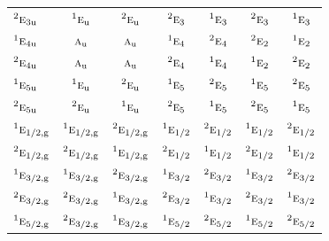 \documentclass[10pt,a4paper]{article}
\numberwithin{equation}{section}
\newcommand{\irr}[1]{\text{\normalfont\scshape #1}}
\newcommand{\conjpair}[1]{{}^{#1}}
\newcommand{\ptag}[1]{\mathrm{#1}}
\begin{document}
{\begin{longtable}{@{}lcccccc@{}}
$\conjpair{2}\irr{e}_{3\ptag{u}}$ & $\conjpair{1}\irr{e}_{\ptag{u}}$ & $\conjpair{2}\irr{e}_{\ptag{u}}$ & $\conjpair{2}\irr{e}_{3}$ & $\conjpair{1}\irr{e}_{3}$ & $\conjpair{2}\irr{e}_{3}$ & $\conjpair{1}\irr{e}_{3}$\\
$\conjpair{1}\irr{e}_{4\ptag{u}}$ & $\irr{a}_{\ptag{u}}$ & $\irr{a}_{\ptag{u}}$ & $\conjpair{1}\irr{e}_{4}$ & $\conjpair{2}\irr{e}_{4}$ & $\conjpair{2}\irr{e}_{2}$ & $\conjpair{1}\irr{e}_{2}$\\
$\conjpair{2}\irr{e}_{4\ptag{u}}$ & $\irr{a}_{\ptag{u}}$ & $\irr{a}_{\ptag{u}}$ & $\conjpair{2}\irr{e}_{4}$ & $\conjpair{1}\irr{e}_{4}$ & $\conjpair{1}\irr{e}_{2}$ & $\conjpair{2}\irr{e}_{2}$\\
$\conjpair{1}\irr{e}_{5\ptag{u}}$ & $\conjpair{1}\irr{e}_{\ptag{u}}$ & $\conjpair{2}\irr{e}_{\ptag{u}}$ & $\conjpair{1}\irr{e}_{5}$ & $\conjpair{2}\irr{e}_{5}$ & $\conjpair{1}\irr{e}_{5}$ & $\conjpair{2}\irr{e}_{5}$\\
$\conjpair{2}\irr{e}_{5\ptag{u}}$ & $\conjpair{2}\irr{e}_{\ptag{u}}$ & $\conjpair{1}\irr{e}_{\ptag{u}}$ & $\conjpair{2}\irr{e}_{5}$ & $\conjpair{1}\irr{e}_{5}$ & $\conjpair{2}\irr{e}_{5}$ & $\conjpair{1}\irr{e}_{5}$\\
$\conjpair{1}\irr{e}_{1/2,\ptag{g}}$ & $\conjpair{1}\irr{e}_{1/2,\ptag{g}}$ & $\conjpair{2}\irr{e}_{1/2,\ptag{g}}$ & $\conjpair{1}\irr{e}_{1/2}$ & $\conjpair{2}\irr{e}_{1/2}$ & $\conjpair{1}\irr{e}_{1/2}$ & $\conjpair{2}\irr{e}_{1/2}$\\
$\conjpair{2}\irr{e}_{1/2,\ptag{g}}$ & $\conjpair{2}\irr{e}_{1/2,\ptag{g}}$ & $\conjpair{1}\irr{e}_{1/2,\ptag{g}}$ & $\conjpair{2}\irr{e}_{1/2}$ & $\conjpair{1}\irr{e}_{1/2}$ & $\conjpair{2}\irr{e}_{1/2}$ & $\conjpair{1}\irr{e}_{1/2}$\\
$\conjpair{1}\irr{e}_{3/2,\ptag{g}}$ & $\conjpair{1}\irr{e}_{3/2,\ptag{g}}$ & $\conjpair{2}\irr{e}_{3/2,\ptag{g}}$ & $\conjpair{1}\irr{e}_{3/2}$ & $\conjpair{2}\irr{e}_{3/2}$ & $\conjpair{1}\irr{e}_{3/2}$ & $\conjpair{2}\irr{e}_{3/2}$\\
$\conjpair{2}\irr{e}_{3/2,\ptag{g}}$ & $\conjpair{2}\irr{e}_{3/2,\ptag{g}}$ & $\conjpair{1}\irr{e}_{3/2,\ptag{g}}$ & $\conjpair{2}\irr{e}_{3/2}$ & $\conjpair{1}\irr{e}_{3/2}$ & $\conjpair{2}\irr{e}_{3/2}$ & $\conjpair{1}\irr{e}_{3/2}$\\
$\conjpair{1}\irr{e}_{5/2,\ptag{g}}$ & $\conjpair{2}\irr{e}_{3/2,\ptag{g}}$ & $\conjpair{1}\irr{e}_{3/2,\ptag{g}}$ & $\conjpair{1}\irr{e}_{5/2}$ & $\conjpair{2}\irr{e}_{5/2}$ & $\conjpair{1}\irr{e}_{5/2}$ & $\conjpair{2}\irr{e}_{5/2}$\\

\end{longtable}}
\end{document}

